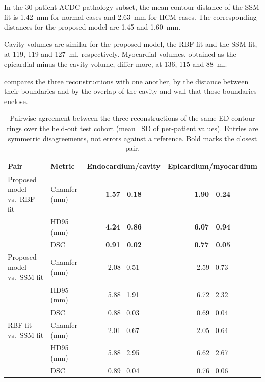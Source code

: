 In the 30-patient ACDC pathology subset, the mean contour distance of the SSM
fit is 1.42~mm for normal cases and 2.63~mm for HCM cases. The
corresponding distances for the proposed model are 1.45 and 1.60~mm.

Cavity volumes are similar for the proposed model, the RBF fit and the SSM fit, at
119, 119 and 127~ml, respectively. Myocardial volumes, obtained as the
epicardial minus the cavity volume, differ more, at 136, 115 and 88~ml.

 compares the three reconstructions with one
another, by the distance between their boundaries and by the overlap of the
cavity and wall that those boundaries enclose.

\begin{table}[H]
  \centering
  \caption[Pairwise agreement between the three reconstructions]    {Pairwise agreement between the three
      reconstructions of the same ED contour rings over the held-out test cohort
      (mean~\textpm{} SD of per-patient values). Entries are symmetric disagreements,
      not errors against a reference. Bold marks the closest pair.}
  \label{tab:reconstruction-agreement}
  \thesistablestyle
  \begin{tabular*}{\textwidth}{@{\extracolsep{\fill}}l l c c@{}}
    \toprule
    \textbf{Pair} & \textbf{Metric} & \textbf{Endocardium/cavity}
      & \textbf{Epicardium/myocardium} \\
    \midrule
    Proposed model vs.\ RBF fit & Chamfer (mm) & \textbf{1.57~\textpm{} 0.18} & \textbf{1.90~\textpm{} 0.24} \\
                          & HD95 (mm)     & \textbf{4.24~\textpm{} 0.86} & \textbf{6.07~\textpm{} 0.94} \\
                          & DSC           & \textbf{0.91~\textpm{} 0.02} & \textbf{0.77~\textpm{} 0.05} \\
    \addlinespace
    Proposed model vs.\ SSM fit & Chamfer (mm) & 2.08~\textpm{} 0.51 & 2.59~\textpm{} 0.73 \\
                          & HD95 (mm)     & 5.88~\textpm{} 1.91 & 6.72~\textpm{} 2.32 \\
                          & DSC           & 0.88~\textpm{} 0.03 & 0.69~\textpm{} 0.04 \\
    \addlinespace
    RBF fit vs.\ SSM fit & Chamfer (mm) & 2.01~\textpm{} 0.67 & 2.05~\textpm{} 0.64 \\
                          & HD95 (mm)     & 5.88~\textpm{} 2.95 & 6.62~\textpm{} 2.67 \\
                          & DSC           & 0.89~\textpm{} 0.04 & 0.76~\textpm{} 0.06 \\
    \bottomrule
  \end{tabular*}
\end{table}

